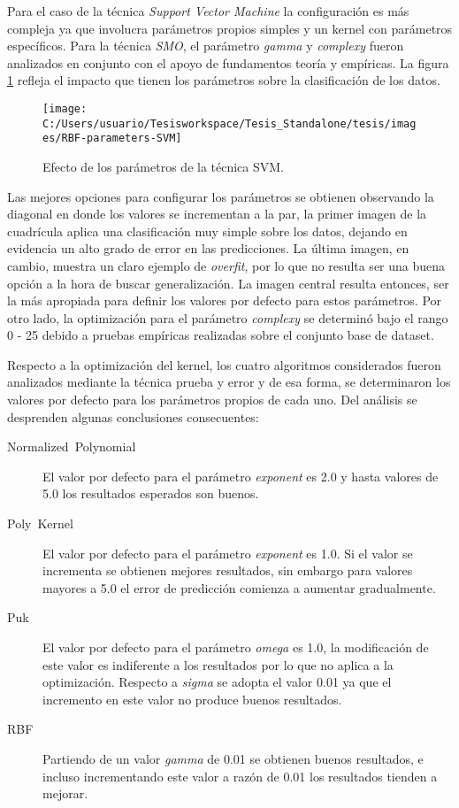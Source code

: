Para el caso de la técnica \emph{Support Vector Machine} la configuración
es más compleja ya que involucra parámetros propios simples y un kernel
con parámetros específicos. Para la técnica \emph{\ac{SMO}}, el parámetro
\emph{gamma} y \emph{complexy} fueron analizados en conjunto con el
apoyo de fundamentos teoría y empíricas. La figura \ref{fig:RBF-parameters-SVM}
refleja el impacto que tienen los parámetros sobre la clasificación
de los datos. 

\begin{figure}[H]
\begin{centering}
\texttt{[image: C:/Users/usuario/Tesisworkspace/Tesis\_Standalone/tesis/images/RBF-parameters-SVM]}
\par\end{centering}

\caption{Efecto de los parámetros de la técnica SVM. \label{fig:RBF-parameters-SVM}}
\end{figure}


Las mejores opciones para configurar los parámetros se obtienen observando
la diagonal en donde los valores se incrementan a la par, la primer
imagen de la cuadrícula aplica una clasificación muy simple sobre
los datos, dejando en evidencia un alto grado de error en las predicciones.
La última imagen, en cambio, muestra un claro ejemplo de \emph{overfit},
por lo que no resulta ser una buena opción a la hora de buscar generalización.
La imagen central resulta entonces, ser la más apropiada para definir
los valores por defecto para estos parámetros. Por otro lado, la optimización
para el parámetro \emph{complexy} se determinó bajo el rango 0 - 25
debido a pruebas empíricas realizadas sobre el conjunto base de dataset. 

Respecto a la optimización del kernel, los cuatro algoritmos considerados
fueron analizados mediante la técnica prueba y error y de esa forma,
se determinaron los valores por defecto para los parámetros propios
de cada uno. Del análisis se desprenden algunas conclusiones consecuentes: 
\begin{description}
\item [{Normalized~Polynomial}] El valor por defecto para el parámetro
\emph{exponent} es 2.0 y hasta valores de 5.0 los resultados esperados
son buenos. 
\item [{Poly~Kernel}] El valor por defecto para el parámetro \emph{exponent}
es 1.0. Si el valor se incrementa se obtienen mejores resultados,
sin embargo para valores mayores a 5.0 el error de predicción comienza
a aumentar gradualmente. 
\item [{Puk}] El valor por defecto para el parámetro \emph{omega} es 1.0,
la modificación de este valor es indiferente a los resultados por
lo que no aplica a la optimización. Respecto a \emph{sigma} se adopta
el valor 0.01 ya que el incremento en este valor no produce buenos
resultados. 
\item [{RBF}] Partiendo de un valor \emph{gamma} de 0.01 se obtienen buenos
resultados, e incluso incrementando este valor a razón de 0.01 los
resultados tienden a mejorar. 
\end{description}

